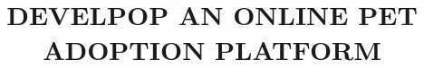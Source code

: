 \documentclass[12pt,a4paper,oneside]{book} %
\title{DEVELPOP AN ONLINE PET ADOPTION PLATFORM}
\begin{document}

\coverpage

\frontmatter

\begin{acknowledgment}
  
\end{acknowledgment}


\begin{commitment}
  
\end{commitment}


\begin{abstract}
  
\end{abstract}

\tableofcontents

\listoftables

\listoffigures

\newpage

\begin{abbreviations}
  
\end{abbreviations}



\mainmatter

\fancyhead{}  %
\renewcommand{\footrulewidth}{0.4pt}

\pagestyle{fancy}  %














\end{document}
